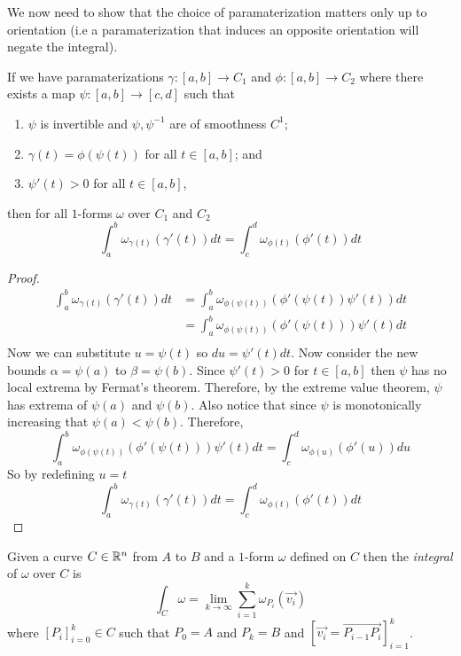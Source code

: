 \documentclass[notes.tex]{subfiles}
\begin{document}
We now need to show that the choice of paramaterization matters only up to orientation (i.e a paramaterization that induces an opposite orientation will negate the integral).
\begin{theorem} \label{integral_uniqueness_up_to_orientation_one_form}
    If we have paramaterizations $\gamma\colon [a, b] \to C_1$ and $\phi\colon [a, b] \to C_2$ where there exists a map $\psi\colon[a, b] \to [c, d]$ such that
    \begin{enumerate}[label = \arabic*)]
        \item $\psi$ is invertible and $\psi, \psi^{-1}$ are of smoothness $C^1$;
        \item $\gamma(t) = \phi(\psi(t))$ for all $t \in [a, b]$; and
        \item $\psi'(t) > 0$ for all $t \in [a, b]$,
    \end{enumerate}
    then for all $1$-forms $\omega$ over $C_1$ and $C_2$
    \[
        \int_a^b \omega_{\gamma(t)}(\gamma'(t))dt = \int_c^d \omega_{\phi(t)}(\phi'(t))dt
    \]
\end{theorem}
\begin{proof}
    \begin{align*}
        \int_a^b \omega_{\gamma(t)}(\gamma'(t))dt
        &= \int_a^b \omega_{\phi(\psi(t))}(\phi'(\psi(t))\psi'(t))dt \\
        &= \int_a^b \omega_{\phi(\psi(t))}(\phi'(\psi(t)))\psi'(t)dt \\
    \end{align*}
    Now we can substitute $u = \psi(t)$ so $du = \psi'(t)dt$. Now consider the new bounds $\alpha = \psi(a)$ to $\beta = \psi(b)$. Since $\psi'(t) > 0$ for $t \in [a, b]$ then $\psi$ has no local extrema by Fermat's theorem. Therefore, by the extreme value theorem, $\psi$ has extrema of $\psi(a)$ and $\psi(b)$. Also notice that since $\psi$ is monotonically increasing that $\psi(a) < \psi(b)$.
    Therefore,
    \[
        \int_a^b \omega_{\phi(\psi(t))}(\phi'(\psi(t)))\psi'(t)dt
        = \int_c^d \omega_{\phi(u)}(\phi'(u))du
    \]
    So by redefining $u = t$
    \[
        \int_a^b \omega_{\gamma(t)}(\gamma'(t))dt = \int_c^d \omega_{\phi(t)}(\phi'(t))dt
    \]
\end{proof}

\begin{definition}
    Given a curve $C \in \mathbb{R}^n$ from $A$ to $B$ and a $1$-form $\omega$ defined on $C$ then the \textit{integral} of $\omega$ over $C$ is
    \[
        \int_C \omega = \lim_{k\to\infty} \sum_{i = 1}^k \omega_{P_i}(\vec{v_i})
    \]
    where $[P_i]_{i = 0}^k \in C$ such that $P_0 = A$ and $P_k = B$ and $[\vec{v_i} = \overrightarrow{P_{i - 1}P_i}]_{i = 1}^k$.
\end{definition}
\end{document}
